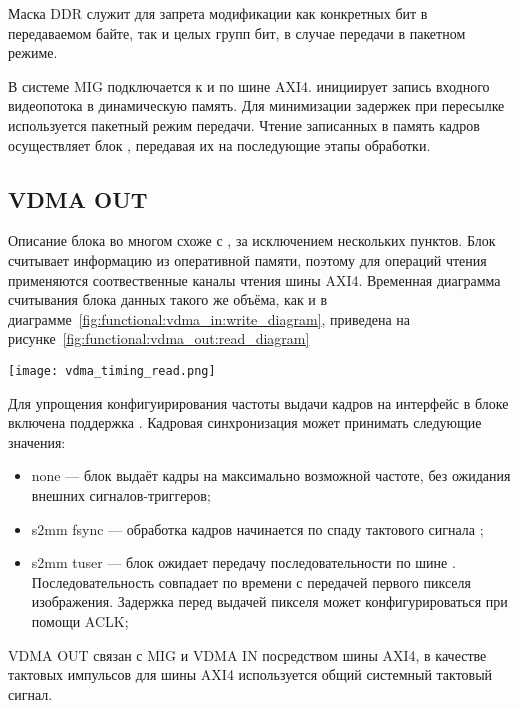 Маска DDR служит для запрета модификации как конкретных бит в передаваемом байте, так и целых групп
бит, в случае передачи в пакетном режиме.

В системе MIG подключается к  и  по шине AXI4.  инициирует
запись входного видеопотока в динамическую память. Для минимизации задержек при пересылке
используется пакетный режим передачи. Чтение записанных в память кадров осуществляет блок
, передавая их на последующие этапы обработки.

\subsection{VDMA OUT}
\label{sec:functional:vdma_out}

Описание блока  во многом схоже с , за исключением нескольких пунктов.
Блок считывает информацию из оперативной памяти, поэтому для операций чтения применяются
соотвественные каналы чтения шины AXI4. Временная диаграмма считывания блока данных такого же
объёма, как и в диаграмме~\ref{fig:functional:vdma_in:write_diagram}, приведена на
рисунке~\ref{fig:functional:vdma_out:read_diagram}

\begin{center}
  \centering
  \texttt{[image: vdma\_timing\_read.png]}
  \label{fig:functional:vdma_out:read_diagram}
\end{center}

Для упрощения конфигуирирования частоты выдачи кадров на  интерфейс в блоке
включена поддержка . Кадровая синхронизация может принимать следующие значения:
\begin{itemize}
  \item none --- блок выдаёт кадры на максимально возможной частоте, без ожидания внешних
    сигналов-триггеров;
  \item s2mm fsync --- обработка кадров начинается по спаду тактового сигнала ;
  \item s2mm tuser --- блок ожидает передачу последовательности  по
    шине . Последовательность совпадает по времени с передачей первого пикселя
    изображения. Задержка перед выдачей пикселя может конфигурироваться при помощи ACLK;
\end{itemize}

VDMA OUT связан с MIG и VDMA IN посредством шины AXI4, в качестве тактовых импульсов для
шины AXI4 используется общий системный тактовый сигнал.

